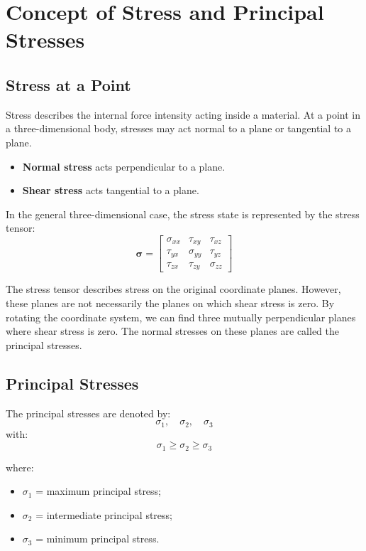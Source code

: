 \documentclass[a4paper,12pt]{article}
\begin{document}
\section{Concept of Stress and Principal Stresses}

\subsection{Stress at a Point}

Stress describes the internal force intensity acting inside a material. At a point in a
three-dimensional body, stresses may act normal to a plane or tangential to a plane.

\begin{itemize}
    \item \textbf{Normal stress} acts perpendicular to a plane.
    \item \textbf{Shear stress} acts tangential to a plane.
\end{itemize}

In the general three-dimensional case, the stress state is represented by the stress tensor:
\[
\boldsymbol{\sigma}
=
\begin{bmatrix}
\sigma_{xx} & \tau_{xy} & \tau_{xz} \\
\tau_{yx} & \sigma_{yy} & \tau_{yz} \\
\tau_{zx} & \tau_{zy} & \sigma_{zz}
\end{bmatrix}
\]

\begin{notebox}
The stress tensor describes stress on the original coordinate planes. However, these
planes are not necessarily the planes on which shear stress is zero. By rotating the
coordinate system, we can find three mutually perpendicular planes where shear stress is
zero. The normal stresses on these planes are called the principal stresses.
\end{notebox}

\subsection{Principal Stresses}

The principal stresses are denoted by:
\[
\sigma_1,\quad \sigma_2,\quad \sigma_3
\]
with:
\[
\sigma_1 \geq \sigma_2 \geq \sigma_3
\]

where:
\begin{itemize}
    \item \(\sigma_1\) = maximum principal stress;
    \item \(\sigma_2\) = intermediate principal stress;
    \item \(\sigma_3\) = minimum principal stress.
\end{itemize}
\end{document}
